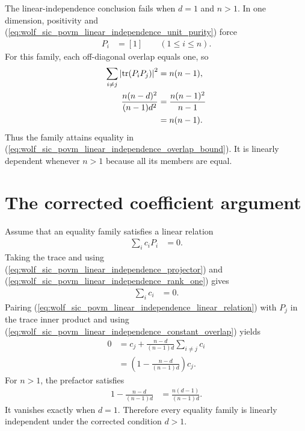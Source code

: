 \documentclass{article}
\begin{document}
The linear-independence conclusion fails when $d=1$ and $n>1$. In one
dimension, positivity and
(\ref{eq:wolf_sic_povm_linear_independence_unit_purity}) force
\begin{align}
    P_i&=[1]
    \qquad(1\leq i\leq n).
    \label{eq:wolf_sic_povm_linear_independence_dimension_one_family}
\end{align}
For this family, each off-diagonal overlap equals one, so
\begin{align}
    \sum_{i\neq j}
        \left|\operatorname{tr}(P_iP_j)\right|^2
        &=n(n-1),
    \label{eq:wolf_sic_povm_linear_independence_dimension_one_left}\\
    \frac{n(n-d)^2}{(n-1)d^2}
        &=\frac{n(n-1)^2}{n-1}
    \label{eq:wolf_sic_povm_linear_independence_dimension_one_right_first}\\
        &=n(n-1).
    \label{eq:wolf_sic_povm_linear_independence_dimension_one_right_value}
\end{align}
Thus the family attains equality in
(\ref{eq:wolf_sic_povm_linear_independence_overlap_bound}). It is linearly
dependent whenever $n>1$ because all its members are equal.

\section{The corrected coefficient argument}

Assume that an equality family satisfies a linear relation
\begin{align}
    \sum_i c_iP_i&=0.
    \label{eq:wolf_sic_povm_linear_independence_linear_relation}
\end{align}
Taking the trace and using
(\ref{eq:wolf_sic_povm_linear_independence_projector}) and
(\ref{eq:wolf_sic_povm_linear_independence_rank_one}) gives
\begin{align}
    \sum_i c_i&=0.
    \label{eq:wolf_sic_povm_linear_independence_coefficient_sum}
\end{align}
Pairing
(\ref{eq:wolf_sic_povm_linear_independence_linear_relation}) with $P_j$ in
the trace inner product and using
(\ref{eq:wolf_sic_povm_linear_independence_constant_overlap}) yields
\begin{align}
    0
        &=c_j+
        \frac{n-d}{(n-1)d}\sum_{i\neq j}c_i
    \label{eq:wolf_sic_povm_linear_independence_pairing_first}\\
        &=
        \left(1-\frac{n-d}{(n-1)d}\right)c_j.
    \label{eq:wolf_sic_povm_linear_independence_pairing_prefactor}
\end{align}
For $n>1$, the prefactor satisfies
\begin{align}
    1-\frac{n-d}{(n-1)d}
        &=\frac{n(d-1)}{(n-1)d}.
    \label{eq:wolf_sic_povm_linear_independence_prefactor_value}
\end{align}
It vanishes exactly when $d=1$. Therefore every equality family is linearly
independent under the corrected condition $d>1$.
\end{document}

